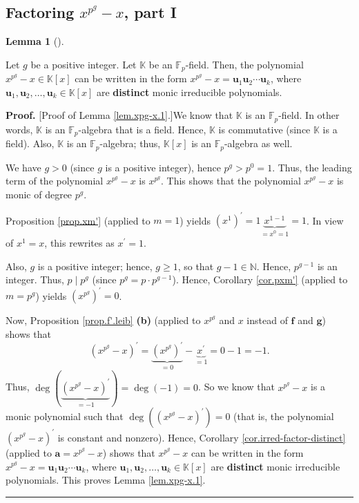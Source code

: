 \documentclass[numbers=enddot,12pt,final,onecolumn,notitlepage]{scrartcl}%
\theoremstyle{definition}
\newtheorem{lem}[theo]{Lemma}
\newenvironment{lemma}[1][]
{\begin{lem}[#1]\begin{leftbar}}
{\end{leftbar}\end{lem}}
\newenvironment{proof}[1][Proof]{\noindent\textbf{#1.} }{\ \rule{0.5em}{0.5em}}
\begin{document}
\subsection{Factoring $x^{p^{g}}-x$, part I}

\begin{lemma}
\label{lem.xpg-x.1}Let $g$ be a positive integer. Let $\mathbb{K}$ be an
$\mathbb{F}_{p}$-field. Then, the polynomial $x^{p^{g}}-x\in\mathbb{K}\left[
x\right]  $ can be written in the form $x^{p^{g}}-x=\mathbf{u}_{1}%
\mathbf{u}_{2}\cdots\mathbf{u}_{k}$, where $\mathbf{u}_{1},\mathbf{u}%
_{2},\ldots,\mathbf{u}_{k}\in\mathbb{K}\left[  x\right]  $ are
\textbf{distinct} monic irreducible polynomials.
\end{lemma}

\begin{proof}
[Proof of Lemma \ref{lem.xpg-x.1}.]We know that $\mathbb{K}$ is an
$\mathbb{F}_{p}$-field. In other words, $\mathbb{K}$ is an $\mathbb{F}_{p}%
$-algebra that is a field. Hence, $\mathbb{K}$ is commutative (since
$\mathbb{K}$ is a field). Also, $\mathbb{K}$ is an $\mathbb{F}_{p}$-algebra;
thus, $\mathbb{K}\left[  x\right]  $ is an $\mathbb{F}_{p}$-algebra as well.

We have $g>0$ (since $g$ is a positive integer), hence $p^{g}>p^{0}=1$. Thus,
the leading term of the polynomial $x^{p^{g}}-x$ is $x^{p^{g}}$. This shows
that the polynomial $x^{p^{g}}-x$ is monic of degree $p^{g}$.

Proposition \ref{prop.xm'} (applied to $m=1$) yields $\left(  x^{1}\right)
^{\prime}=1\underbrace{x^{1-1}}_{=x^{0}=1}=1$. In view of $x^{1}=x$, this
rewrites as $x^{\prime}=1$.

Also, $g$ is a positive integer; hence, $g\geq1$, so that $g-1\in\mathbb{N}$.
Hence, $p^{g-1}$ is an integer. Thus, $p\mid p^{g}$ (since $p^{g}=p\cdot
p^{g-1}$). Hence, Corollary \ref{cor.pxm'} (applied to $m=p^{g}$) yields
$\left(  x^{p^{g}}\right)  ^{\prime}=0$.

Now, Proposition \ref{prop.f'.leib} \textbf{(b)} (applied to $x^{p^{g}}$ and
$x$ instead of $\mathbf{f}$ and $\mathbf{g}$) shows that
\[
\left(  x^{p^{g}}-x\right)  ^{\prime}=\underbrace{\left(  x^{p^{g}}\right)
^{\prime}}_{=0}-\underbrace{x^{\prime}}_{=1}=0-1=-1.
\]
Thus, $\deg\left(  \underbrace{\left(  x^{p^{g}}-x\right)  ^{\prime}}%
_{=-1}\right)  =\deg\left(  -1\right)  =0$. So we know that $x^{p^{g}}-x$ is a
monic polynomial such that $\deg\left(  \left(  x^{p^{g}}-x\right)  ^{\prime
}\right)  =0$ (that is, the polynomial $\left(  x^{p^{g}}-x\right)  ^{\prime}$
is constant and nonzero). Hence, Corollary \ref{cor.irred-factor-distinct}
(applied to $\mathbf{a}=x^{p^{g}}-x$) shows that $x^{p^{g}}-x$ can be written
in the form $x^{p^{g}}-x=\mathbf{u}_{1}\mathbf{u}_{2}\cdots\mathbf{u}_{k}$,
where $\mathbf{u}_{1},\mathbf{u}_{2},\ldots,\mathbf{u}_{k}\in\mathbb{K}\left[
x\right]  $ are \textbf{distinct} monic irreducible polynomials. This proves
Lemma \ref{lem.xpg-x.1}.
\end{proof}
\end{document}
